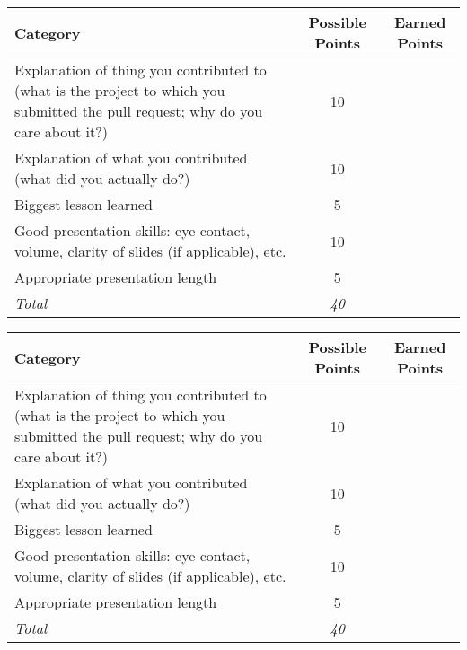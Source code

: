 \documentclass[a4paper, 12 pt]{curve}
\begin{document}
\renewcommand{\arraystretch}{2}
\begin{center}
\begin{tabu}{| X | c | c |}\hline
\textbf{Category} & \textbf{Possible Points} & \textbf{Earned Points} \\ \hline \hline
Explanation of thing you contributed to (what is the project to which you submitted the pull request; why do you care about it?)& 10 & \\ \hline
Explanation of what you contributed (what did you actually do?) & 10 & \\ \hline
Biggest lesson learned & 5 & \\ \hline
Good presentation skills: eye contact, volume, clarity of slides (if applicable), etc. & 10 & \\ \hline
Appropriate presentation length & 5 & \\ \hline
\textit{Total} & \textit{40} & \\\hline
\end{tabu} 
\end{center}

\vspace*{5 em}

\begin{center}
\begin{tabu}{| X | c | c |}\hline
\textbf{Category} & \textbf{Possible Points} & \textbf{Earned Points} \\ \hline \hline
Explanation of thing you contributed to (what is the project to which you submitted the pull request; why do you care about it?)& 10 & \\ \hline
Explanation of what you contributed (what did you actually do?) & 10 & \\ \hline
Biggest lesson learned & 5 & \\ \hline
Good presentation skills: eye contact, volume, clarity of slides (if applicable), etc. & 10 & \\ \hline
Appropriate presentation length & 5 & \\ \hline
\textit{Total} & \textit{40} & \\\hline
\end{tabu} 
\end{center}
\end{document}
